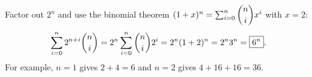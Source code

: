 Factor out $2^n$ and use the binomial theorem $(1+x)^n=\sum_{i=0}^n\dbinom nix^i$ with $x=2$:
\[\sum_{i=0}^{n}2^{n+i}\dbinom ni=2^n\sum_{i=0}^n\dbinom ni2^i=2^n(1+2)^n=2^n3^n=\boxed{6^n}.\]
For example, $n=1$ gives $2+4=6$ and $n=2$ gives $4+16+16=36$.
